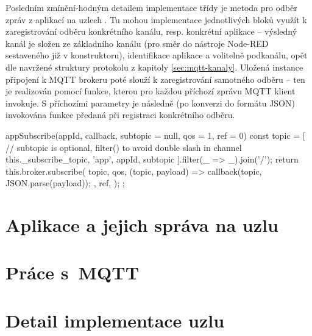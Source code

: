 Posledním zmínění-hodným detailem implementace třídy  je metoda pro odběr zpráv z aplikací na uzlech
.
Tu mohou implementace jednotlivých bloků využít k zaregistrování odběru konkrétního kanálu, resp. konkrétní aplikace
-- výsledný kanál je složen ze základního kanálu (pro směr do nástroje Node-RED sestaveného již v konstruktoru),
identifikace aplikace  a volitelně podkanálu, opět dle navržené struktury protokolu z kapitoly
\ref{sec:mqtt-kanaly}.
Uložená instance připojení k MQTT brokeru poté slouží k zaregistrování samotného odběru -- ten je realizován pomocí
funkce, kterou pro každou příchozí zprávu MQTT klient invokuje.
S příchozími parametry je následně (po konverzi do formátu JSON) invokována funkce předaná při registraci konkrétního
odběru.

\begin{code}[
    language=Javascript,
    label=code:fis-node-app-subscribe,
    caption={Detail z implementace třídy \ic{FisNode} -- metoda \ic{appSubscribe} je určená k zaregistrování odběru
kanálu odpovídajícího konkrétní aplikaci na konkrétním uzlu.}
]
appSubscribe(appId, callback, subtopic = null, qos = 1, ref = 0) {
    const topic = [
        // subtopic is optional, filter() to avoid double slash in channel
        this._subscribe_topic, 'app', appId, subtopic
    ].filter(_ => _).join('/');
    return this.broker.subscribe(
        topic,
        qos,
        (topic, payload) => {
            callback(topic, JSON.parse(payload));
        },
        ref,
    );
};
\end{code}

\section{Aplikace a jejich správa na uzlu}

\section{Práce s~MQTT}

\section{Detail implementace uzlu}
